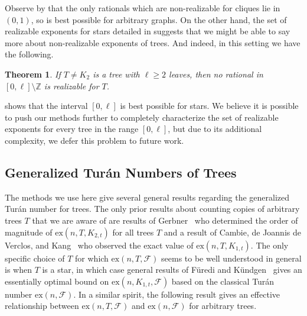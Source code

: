 \documentclass[12pt,letterpaper]{article}
\newtheorem{theorem}{Theorem}[section]
\theoremstyle{definition}
\newcommand{\ex}{\mathrm{ex}}
\renewcommand{\c}[1]{\mathcal{#1}}
\begin{document}
	Observe by  that the only rationals which are non-realizable for cliques lie in $(0,1)$, so  is best possible for arbitrary graphs.  On the other hand, the set of realizable exponents for stars detailed in  suggests that we might be able to say more about non-realizable exponents of trees.  And indeed, in this setting we have the following.
	\begin{theorem}\label{theorem:leafNonrealizable}
		If $T\ne K_2$ is a tree with $\ell\ge 2$ leaves, then no rational in $[0,\ell]\setminus \mathbb{Z}$ is realizable for $T$.
	\end{theorem}
	 shows that the interval $[0,\ell]$ is best possible for stars.  We believe it is possible to push our methods further to completely characterize the set of realizable exponents for every tree in the range $[0,\ell]$, but due to its additional complexity, we defer this problem to future work.  
	
	\subsection{Generalized \texorpdfstring{Tur\'an}{Turan} Numbers of Trees}
	
	The methods we use here give several general results regarding the generalized Tur\'an number for trees.  The only prior results about counting copies of arbitrary trees $T$ that we are aware of are results of Gerbner~\cite{G2023} who determined the order of magnitude of $\ex(n,T,K_{2,t})$ for all trees $T$ and a result of Cambie, de Joannis de Verclos, and Kang~\cite{CJK23} who observed the exact value of $\ex(n,T,K_{1,t})$.  The only specific choice of $T$ for which $\ex(n,T,\c{F})$ seems to be well understood in general is when $T$ is a star, in which case general results of F\" uredi and K\" undgen~\cite{FK2006} gives an essentially optimal bound on $\ex(n,K_{1,t},\c{F})$ based on the classical Tur\'an number $\ex(n,\c{F})$.   In a similar spirit, the following result gives an effective relationship between $\ex(n,T,\c{F})$ and $\ex(n,\c{F})$ for arbitrary trees.
	
	
\end{document}
